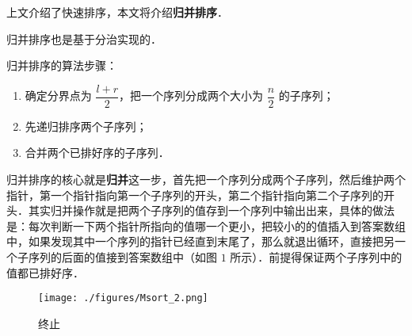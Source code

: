 
上文介绍了快速排序，本文将介绍\textbf{归并排序}．

归并排序也是基于分治实现的．

归并排序的算法步骤：
\begin{enumerate}
\item 确定分界点为 $\dfrac{l + r}{2}$，把一个序列分成两个大小为 $\dfrac{n}{2}$ 的子序列；
\item 先递归排序两个子序列；
\item 合并两个已排好序的子序列．
\end{enumerate}

归并排序的核心就是\textbf{归并}这一步，首先把一个序列分成两个子序列，然后维护两个指针，第一个指针指向第一个子序列的开头，第二个指针指向第二个子序列的开头．其实归并操作就是把两个子序列的值存到一个序列中输出出来，具体的做法是：每次判断一下两个指针所指向的值哪一个更小，把较小的的值插入到答案数组中，如果发现其中一个序列的指针已经直到末尾了，那么就退出循环，直接把另一个子序列的后面的值接到答案数组中（如图 $1$ 所示）．前提得保证两个子序列中的值都已排好序．

\begin{figure}[ht]
\centering
\texttt{[image: ./figures/Msort\_2.png]}
\caption{终止} \label{Msort_fig2}
\end{figure}

